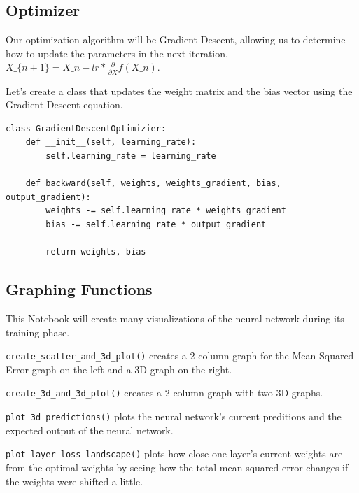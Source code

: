 \documentclass[openany]{book}
\begin{document}
    \subsection{Optimizer}\label{optimizer}

Our optimization algorithm will be Gradient Descent, allowing us to
determine how to update the parameters in the next iteration.
$ X\_\{n+1\} = X\_n - lr * \frac{\partial}{\partial X} f(X\_n)$.

Let's create a class that updates the weight matrix and the bias vector
using the Gradient Descent equation.

\begin{tcolorbox}
\tiny
\begin{verbatim}
class GradientDescentOptimizier:
    def __init__(self, learning_rate):
        self.learning_rate = learning_rate

    def backward(self, weights, weights_gradient, bias, output_gradient):
        weights -= self.learning_rate * weights_gradient
        bias -= self.learning_rate * output_gradient

        return weights, bias
\end{verbatim}
\end{tcolorbox}

    \subsection{Graphing Functions}\label{graphing-functions}

This Notebook will create many visualizations of the neural network
during its training phase.

\texttt{create\_scatter\_and\_3d\_plot()} creates a 2 column graph for
the Mean Squared Error graph on the left and a 3D graph on the right.

\texttt{create\_3d\_and\_3d\_plot()} creates a 2 column graph with two
3D graphs.

\texttt{plot\_3d\_predictions()} plots the neural network's current
preditions and the expected output of the neural network.

\texttt{plot\_layer\_loss\_landscape()} plots how close one layer's
current weights are from the optimal weights by seeing how the total
mean squared error changes if the weights were shifted a little.
\end{document}
